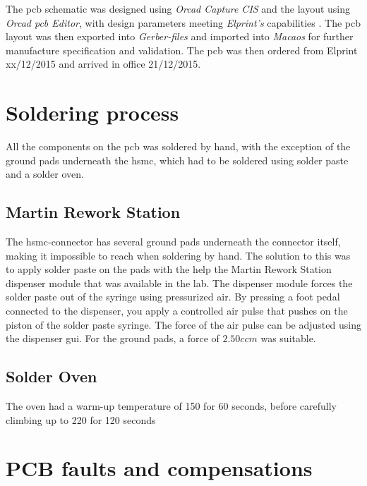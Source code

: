 \documentclass[main.tex]{subfiles}
\begin{document}
The \gls{pcb} schematic was designed using \textit{Orcad Capture CIS} and the layout using \textit{Orcad \gls{pcb} Editor}, with design parameters meeting \textit{Elprint's} capabilities \cite{elprint15}. The \gls{pcb} layout was then exported into \textit{Gerber-files} and imported into \textit{Macaos} for further manufacture specification and validation. The \gls{pcb} was then ordered from Elprint xx/12/2015 and arrived in office 21/12/2015.

\section{Soldering process}

All the components on the \gls{pcb} was soldered by hand, with the exception of the ground pads underneath the \gls{hsmc}, which had to be soldered using solder paste and a solder oven.

\subsection{Martin Rework Station}

The \gls{hsmc}-connector has several ground pads underneath the connector itself, making it impossible to reach when soldering by hand. The solution to this was to apply solder paste on the pads with the help the Martin Rework Station dispenser module that was available in the lab. The dispenser module forces the solder paste out of the syringe using pressurized air. By pressing a foot pedal connected to the dispenser, you apply a controlled air pulse that pushes on the piston of the solder paste syringe. The force of the air pulse can be adjusted using the dispenser \gls{gui}. For the ground pads, a force of $2.50 ccm$ was suitable.  

\subsection{Solder Oven}


The oven had a warm-up temperature of 150  for 60 seconds, before carefully climbing up to 220 for 120 seconds

\section{PCB faults and compensations}
\end{document}

